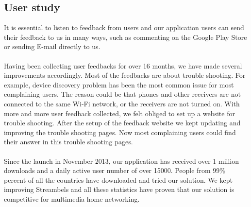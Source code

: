 \subsection{User study}
It is essential to listen to feedback from users and our application users can send their feedback to us in many ways, such as commenting on the Google Play Store or sending E-mail directly to us.\\
\\
Having been collecting user feedbacks for over 16 months, we have made several improvements accordingly. Most of the feedbacks are about trouble shooting. For example, device discovery problem has been the most common issue for most complaining users. The reason could be that phones and other receivers are not connected to the same Wi-Fi network, or the receivers are not turned on. With more and more user feedback collected, we felt obliged to set up a website for trouble shooting. After the setup of the feedback website we kept updating and improving the trouble shooting pages. Now most complaining users could find their answer in this trouble shooting pages.\\
\\
Since the launch in November 2013, our application has received over 1 million
downloads and a daily active user number of over 15000. People from 99\% percent of all the countries have downloaded and tried our solution. We kept improving Streambels and all these statistics have proven that our solution is competitive for multimedia home networking.